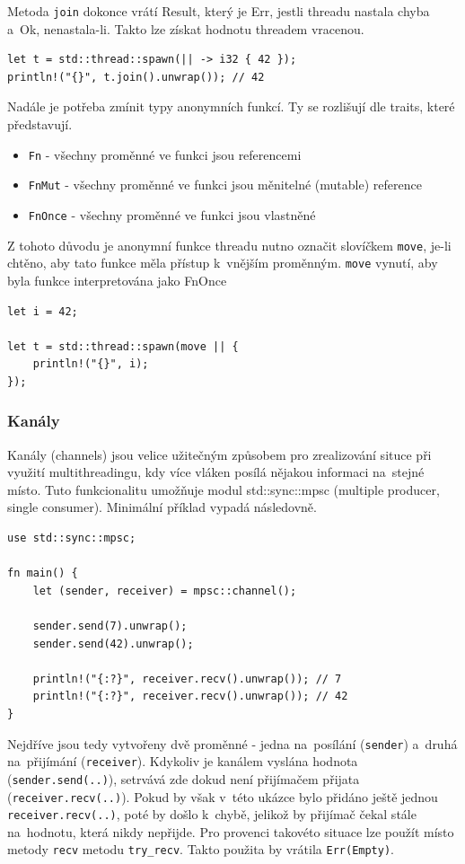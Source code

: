 \documentclass[a4paper, 12pt]{article} %
\newcommand{\rust}[1]{\texttt{#1}}
\begin{document}
		Metoda \rust{join} dokonce vrátí Result, který je Err, jestli threadu nastala chyba a~Ok, nenastala-li. Takto lze získat hodnotu threadem vracenou.
		\begin{verbatim}
let t = std::thread::spawn(|| -> i32 { 42 });
println!("{}", t.join().unwrap()); // 42
		\end{verbatim}
		
		Nadále je potřeba zmínit typy anonymních funkcí. Ty se rozlišují dle traits, které představují.
		\begin{itemize}
			\item \rust{Fn} - všechny proměnné ve funkci jsou referencemi
			\item \rust{FnMut} - všechny proměnné ve funkci jsou měnitelné (mutable) reference
			\item \rust{FnOnce} - všechny proměnné ve funkci jsou vlastněné
		\end{itemize}
		
		Z tohoto důvodu je anonymní funkce threadu nutno označit slovíčkem \rust{move}, je-li chtěno, aby tato funkce měla přístup k~vnějším proměnným. \rust{move} vynutí, aby byla funkce interpretována jako FnOnce
		\begin{verbatim}
let i = 42;

let t = std::thread::spawn(move || {
	println!("{}", i);
});
		\end{verbatim}
		
		\subsubsection*{Kanály}
			Kanály (channels) jsou velice užitečným způsobem pro zrealizování situce při využití multithreadingu, kdy více vláken posílá nějakou informaci na~stejné místo. Tuto funkcionalitu umožňuje modul std::sync::mpsc (multiple producer, single consumer). Minimální příklad vypadá následovně.
			\begin{verbatim}
use std::sync::mpsc;

fn main() {
	let (sender, receiver) = mpsc::channel();
	
	sender.send(7).unwrap();
	sender.send(42).unwrap();

	println!("{:?}", receiver.recv().unwrap()); // 7
	println!("{:?}", receiver.recv().unwrap()); // 42
}
			\end{verbatim}
			
			Nejdříve jsou tedy vytvořeny dvě proměnné - jedna na~posílání (\rust{sender}) a~druhá na~přijímání (\rust{receiver}). Kdykoliv je kanálem vyslána hodnota \linebreak(\rust{sender.send(..)}), setrvává zde dokud není přijímačem přijata \linebreak(\rust{receiver.recv(..)}). Pokud by však v~této ukázce bylo přidáno ještě jednou \rust{receiver.recv(..)}, poté by došlo k~chybě, jelikož by přijímač čekal stále na~hodnotu, která nikdy nepřijde. Pro provenci takovéto situace lze použít místo metody \rust{recv} metodu \rust{try_recv}. Takto použita by vrátila \rust{Err(Empty)}.
			
\end{document}
